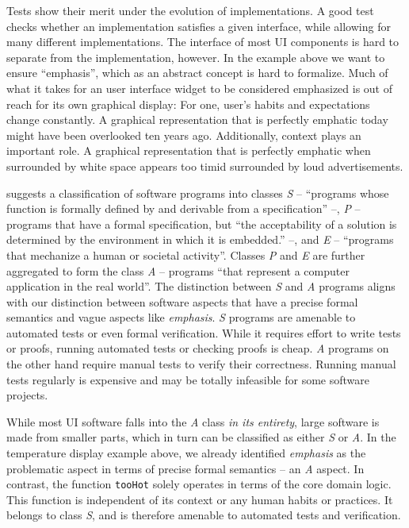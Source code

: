 \documentclass[sigplan,screen]{acmart}
\begin{document}
Tests show their merit under the evolution of implementations. A good
test checks whether an implementation satisfies a given interface,
while allowing for many different implementations. The interface of
most UI components is hard to separate from the implementation,
however. In the example above we want to ensure ``emphasis'', which as
an abstract concept is hard to formalize. Much of what it takes for an
user interface widget to be considered emphasized is out of reach for
its own graphical display: For one, user's habits and expectations
change constantly. A graphical representation that is perfectly
emphatic today might have been overlooked ten years ago. Additionally,
context plays an important role. A graphical representation that is
perfectly emphatic when surrounded by white space appears too timid
surrounded by loud advertisements.

\cite{SPE} suggests a classification of software programs into classes
\textit{S} -- ``programs whose function is formally defined by and
derivable from a specification'' --, \textit{P} -- programs that have
a formal specification, but ``the acceptability of a solution is
determined by the environment in which it is embedded.''  --, and
\textit{E} -- ``programs that mechanize a human or societal
activity''. Classes \textit{P} and \textit{E} are further aggregated
to form the class \textit{A} -- programs ``that represent a computer
application in the real world''. The distinction between \textit{S}
and \textit{A} programs aligns with our distinction between software
aspects that have a precise formal semantics and vague aspects like
\textit{emphasis}. \textit{S} programs are amenable to automated tests
or even formal verification. While it requires effort to write tests
or proofs, running automated tests or checking proofs is
cheap. \textit{A} programs on the other hand require manual tests to
verify their correctness. Running manual tests regularly is expensive
and may be totally infeasible for some software projects.

While most UI software falls into the \textit{A} class \textit{in its
  entirety}, large software is made from smaller parts, which in turn
can be classified as either \textit{S} or \textit{A}. In the
temperature display example above, we already identified
\textit{emphasis} as the problematic aspect in terms of precise formal
semantics -- an \textit{A} aspect. In contrast, the function
\texttt{tooHot} solely operates in terms of the core domain
logic. This function is independent of its context or any human habits
or practices. It belongs to class \textit{S}, and is therefore
amenable to automated tests and verification.
\end{document}
